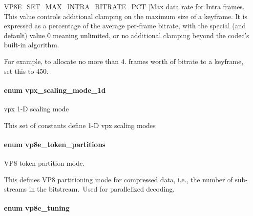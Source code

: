 \begin{Desc}
\begin{description}
{\hypertarget{group__vp8__encoder_gga6deae3d561c838952552c3d3756322eca09c69ff4a3aabdb307d4f24027dfc4c1}{V\-P8\-E\-\_\-\-S\-E\-T\-\_\-\-M\-A\-X\-\_\-\-I\-N\-T\-R\-A\-\_\-\-B\-I\-T\-R\-A\-T\-E\-\_\-\-P\-C\-T}\label{group__vp8__encoder_gga6deae3d561c838952552c3d3756322eca09c69ff4a3aabdb307d4f24027dfc4c1}
}]Max data rate for Intra frames. This value controls additional clamping on the maximum size of a keyframe. It is expressed as a percentage of the average per-\/frame bitrate, with the special (and default) value 0 meaning unlimited, or no additional clamping beyond the codec's built-\/in algorithm.

For example, to allocate no more than 4. frames worth of bitrate to a keyframe, set this to 450. \end{description}
\end{Desc}
\hypertarget{group__vp8__encoder_ga70071b1bb6cac9a1ef0ea3d8362ff94f}{
\paragraph[{vpx\-\_\-scaling\-\_\-mode\-\_\-1d}]{\setlength{\rightskip}{0pt plus 5cm}enum {\bf vpx\-\_\-scaling\-\_\-mode\-\_\-1d}}}\label{group__vp8__encoder_ga70071b1bb6cac9a1ef0ea3d8362ff94f}


vpx 1-\/\-D scaling mode 

This set of constants define 1-\/\-D vpx scaling modes \hypertarget{group__vp8__encoder_ga5f7508ba3fb453b47f62313ed0b864d2}{
\paragraph[{vp8e\-\_\-token\-\_\-partitions}]{\setlength{\rightskip}{0pt plus 5cm}enum {\bf vp8e\-\_\-token\-\_\-partitions}}}\label{group__vp8__encoder_ga5f7508ba3fb453b47f62313ed0b864d2}


V\-P8 token partition mode. 

This defines V\-P8 partitioning mode for compressed data, i.\-e., the number of sub-\/streams in the bitstream.\- \-Used for parallelized decoding. \hypertarget{group__vp8__encoder_ga371dbc29054b3d46364af996ad42ab94}{
\paragraph[{vp8e\-\_\-tuning}]{\setlength{\rightskip}{0pt plus 5cm}enum {\bf vp8e\-\_\-tuning}}}\label{group__vp8__encoder_ga371dbc29054b3d46364af996ad42ab94}


